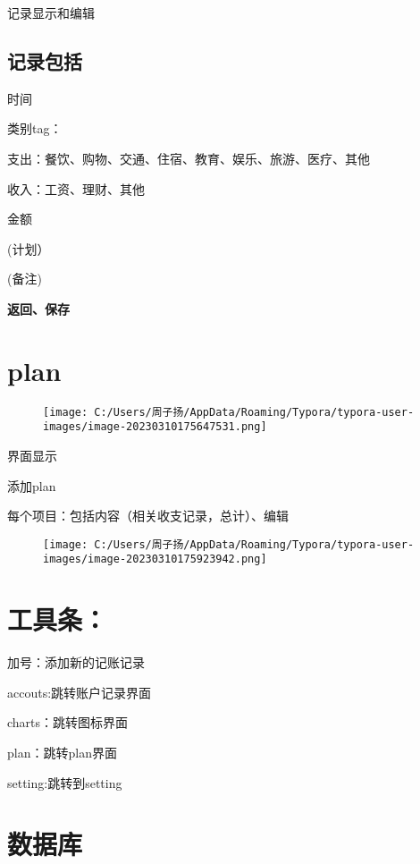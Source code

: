 \documentclass[
]{article}
\begin{document}
记录显示和编辑

\hypertarget{ux8bb0ux5f55ux5305ux62ec-2}{%
\subsection{记录包括}\label{ux8bb0ux5f55ux5305ux62ec-2}}

时间

类别tag：

支出：餐饮、购物、交通、住宿、教育、娱乐、旅游、医疗、其他

收入：工资、理财、其他

金额

(计划）

(备注)

\textbf{返回、保存}

\hypertarget{plan}{%
\section{plan}\label{plan}}

\begin{figure}
\centering
\texttt{[image: C:/Users/周子扬/AppData/Roaming/Typora/typora-user-images/image-20230310175647531.png]}
\caption{}
\end{figure}

界面显示

添加plan

每个项目：包括内容（相关收支记录，总计）、编辑

\begin{figure}
\centering
\texttt{[image: C:/Users/周子扬/AppData/Roaming/Typora/typora-user-images/image-20230310175923942.png]}
\caption{}
\end{figure}

\hypertarget{ux5de5ux5177ux6761}{%
\section{工具条：}\label{ux5de5ux5177ux6761}}

加号：添加新的记账记录

accouts:跳转账户记录界面

charts：跳转图标界面

plan：跳转plan界面

setting:跳转到setting

\hypertarget{ux6570ux636eux5e93}{%
\section{数据库}\label{ux6570ux636eux5e93}}
\end{document}
